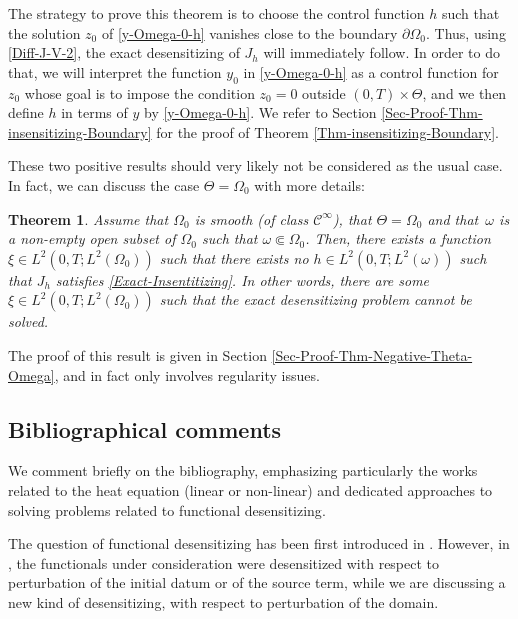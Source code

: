 \documentclass[11pt]{article}
\numberwithin{equation}{section}
\newcounter{question}
\newtheorem{theorem}{Theorem}[section]
\theoremstyle{definition}
\begin{document}
The strategy to prove this theorem is to choose the control function $h$ such that the solution $z_0$ of \eqref{y-Omega-0-h} vanishes close to the boundary $\partial \Omega_0$. Thus, using \eqref{Diff-J-V-2}, the exact desensitizing of $J_h$ will immediately follow. In order to do that, we will interpret the function $y_0$ in \eqref{y-Omega-0-h} as a control function for $z_0$ whose goal is to impose the condition $z_0 = 0$ outside $(0,T) \times \Theta$, and we then define $h$ in terms of $y$ by \eqref{y-Omega-0-h}. We refer to Section \ref{Sec-Proof-Thm-insensitizing-Boundary} for the proof of Theorem \ref{Thm-insensitizing-Boundary}.

These two positive results should very likely not be considered as the usual case. In fact, we can discuss the case $\Theta = \Omega_0$ with more details:

\begin{theorem}
\label{Thm-Negative-Theta-Omega}
Assume that {$\Omega_0$ is smooth (of class $\mathscr{C}^\infty$)}, that $\Theta = \Omega_0$ and that~$\omega$ is a non-empty open subset of $\Omega_0$ such that $\omega \Subset \Omega_0$. Then, there exists a function $\xi \in L^2(0,T; L^2(\Omega_0))$ such that there exists no $h \in L^2(0,T; L^2(\omega))$ such that $J_h$ satisfies \eqref{Exact-Insentitizing}. In other words, there are some $\xi \in L^2(0,T; L^2(\Omega_0))$ such that the exact desensitizing problem cannot be solved.
\end{theorem}

The proof of this result is given in Section \ref{Sec-Proof-Thm-Negative-Theta-Omega}, and in fact only involves regularity issues.

\subsection{Bibliographical comments}\label{sec:SoA}

We comment briefly on the bibliography, emphasizing particularly the works related to the heat equation (linear or non-linear) and dedicated approaches to solving problems related to {functional desensitizing}.

The question of {functional desensitizing} has been first introduced in \cite{Lions-Sentinelles-1992,Bodart-Fabre}. However, in \cite{Lions-Sentinelles-1992,Bodart-Fabre}, the functionals under consideration were desensitized with respect to perturbation of the initial datum or of the source term, while we are discussing a new kind of desensitizing, with respect to perturbation of the domain.
\end{document}
